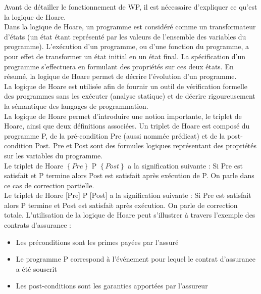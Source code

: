 Avant de détailler le fonctionnement de WP, il est nécessaire d'expliquer ce qu'est la logique de Hoare.
\\
\noindent
Dans la logique de Hoare, un programme est considéré comme un transformateur d’états (un état étant représenté par les valeurs de l'ensemble des variables du programme). L'exécution d'un programme, ou d'une fonction du programme, a pour effet de transformer un état initial en un état final. La spécification d’un programme s’effectuera en formulant des propriétés sur ces deux états. En résumé, la logique de Hoare permet de décrire l'évolution d'un programme.
\\
\noindent
La logique de Hoare est utilisée afin de fournir un outil de vérification formelle des programmes sans les exécuter (analyse statique) et de décrire rigoureusement la sémantique des langages de programmation.
\\
\noindent
La logique de Hoare permet d'introduire une notion importante, le triplet de Hoare, ainsi que deux définitions associées. Un triplet de Hoare est composé du programme P, de la pré-condition Pre (aussi nommée prédicat) et de la post-condition Post. Pre et Post sont des formules logiques représentant des propriétés sur les variables du programme.
\\
\noindent
Le triplet de Hoare $\left\{Pre\right\}$ P $\left\{Post\right\}$ a la signification suivante : Si Pre est satisfait et P termine alors Post est satisfait après exécution de P. On parle dans ce cas de correction partielle.
\\
\noindent
Le triplet de Hoare [Pre] P [Post] a la signification suivante : Si Pre est satisfait alors P termine et Post est satisfait après exécution. On parle de correction totale.
\newline
\newline
\noindent
L'utilisation de la logique de Hoare peut s'illustrer à travers l'exemple des contrats d'assurance :
\begin{itemize}
	\item Les préconditions sont les primes payées par l'assuré
	\item Le programme P correspond à l'événement pour lequel le contrat d'assurance a été souscrit
	\item Les post-conditions sont les garanties apportées par l'assureur
\end{itemize}

